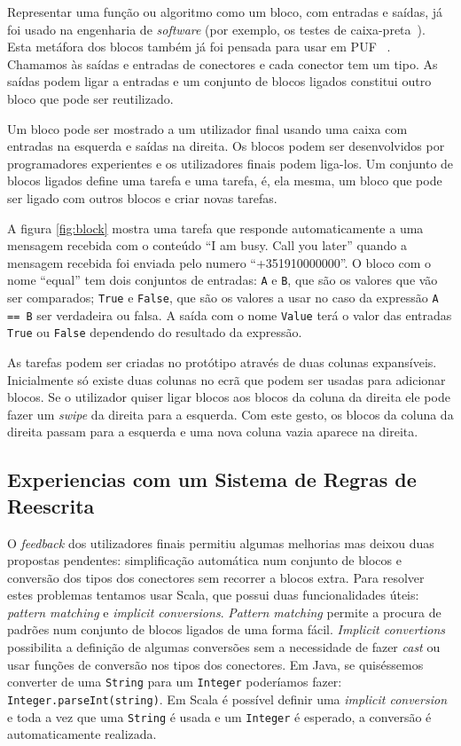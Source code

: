 \documentclass[9pt,a4paper]{extarticle}
\begin{document}
\begin{multicols}{2}
Representar uma função ou algoritmo como um bloco, com entradas e saídas, já foi usado na engenharia de \emph{software} (por exemplo, os testes de caixa-preta~\cite{BlackBoxTesting}). Esta metáfora dos blocos também já foi pensada para usar em PUF ~\cite{Zin2011}. Chamamos às saídas e entradas de conectores e cada conector tem um tipo. As saídas podem ligar a entradas e um conjunto de blocos ligados constitui outro bloco que pode ser reutilizado.

Um bloco pode ser mostrado a um utilizador final usando uma caixa com entradas na esquerda e saídas na direita. Os blocos podem ser desenvolvidos por programadores experientes e os utilizadores finais podem liga-los. Um conjunto de blocos ligados define uma tarefa e uma tarefa, é, ela mesma, um bloco que pode ser ligado com outros blocos e criar novas tarefas.

A figura \ref{fig:block} mostra uma tarefa que responde automaticamente a uma mensagem recebida com o conteúdo ``I am busy. Call you later'' quando a mensagem recebida foi enviada pelo numero ``+351910000000''. O bloco com o nome ``equal''
tem dois conjuntos de entradas: \texttt{A} e \texttt{B}, que são os valores que vão ser comparados; \texttt{True} e \texttt{False}, que são os valores a usar no caso da expressão \texttt{A == B} ser verdadeira ou falsa. 
A saída com o nome \texttt{Value} terá o valor das entradas \texttt{True} ou \texttt{False} dependendo do resultado da expressão.

As tarefas podem ser criadas no protótipo através de duas colunas expansíveis. Inicialmente só existe duas colunas no ecrã que podem ser usadas para adicionar blocos. Se o utilizador quiser ligar blocos aos blocos da coluna da direita ele pode fazer um \emph{swipe} da direita para a esquerda. Com este gesto, os blocos da coluna da direita passam para a esquerda e uma nova coluna vazia aparece na direita.

\subsection{Experiencias com um Sistema de Regras de Reescrita}

O \emph{feedback} dos utilizadores finais permitiu algumas melhorias mas deixou duas propostas pendentes: simplificação automática num conjunto de blocos e conversão dos tipos dos conectores sem recorrer a blocos extra. Para resolver estes problemas tentamos usar Scala, que possui duas funcionalidades úteis: \emph{pattern matching} e \emph{implicit conversions}. \emph{Pattern matching} permite a procura de padrões num conjunto de blocos ligados de uma forma fácil. \emph{Implicit convertions} possibilita a definição de algumas conversões sem a necessidade de fazer \emph{cast} ou usar funções de conversão nos tipos dos conectores. Em Java, se quiséssemos converter de uma \texttt{String} para um \texttt{Integer} poderíamos fazer: \texttt{Integer.parseInt(string)}. Em Scala é possível definir uma \emph{implicit conversion} e toda a vez que uma \texttt{String} é usada e um \texttt{Integer} é esperado, a conversão é automaticamente realizada.


\end{multicols}
\end{document}
